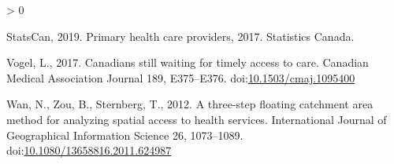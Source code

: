 \documentclass[]{elsarticle} %
\newlength{\cslhangindent}
\newenvironment{CSLReferences}[2] %
 {%
  \setlength{\parindent}{0pt}
  \ifodd #1 \everypar{\setlength{\hangindent}{\cslhangindent}}\ignorespaces\fi
  \ifnum #2 > 0
  \setlength{\parskip}{#2\baselineskip}
  \fi
 }%
 {}
\begin{document}
\begin{CSLReferences}{1}{0}
\leavevmode\hypertarget{ref-statcan2019}{}%
StatsCan, 2019. Primary health care providers, 2017. Statistics Canada.

\leavevmode\hypertarget{ref-vogel2017}{}%
Vogel, L., 2017. Canadians still waiting for timely access to care.
Canadian Medical Association Journal 189, E375--E376.
doi:\href{https://doi.org/10.1503/cmaj.1095400}{10.1503/cmaj.1095400}

\leavevmode\hypertarget{ref-wan2012}{}%
Wan, N., Zou, B., Sternberg, T., 2012. A three-step floating catchment
area method for analyzing spatial access to health services.
International Journal of Geographical Information Science 26,
1073--1089.
doi:\href{https://doi.org/10.1080/13658816.2011.624987}{10.1080/13658816.2011.624987}

\end{CSLReferences}
\end{document}
